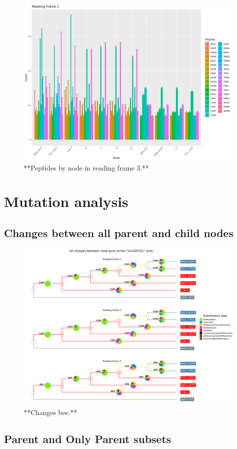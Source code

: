 \documentclass[
]{book}
\begin{document}
\begin{figure}
\includegraphics[width=1\linewidth]{figures/Peptides_RF3} \caption{**Peptides by node in reading frame 3.**}\label{fig:FIG9x}
\end{figure}

\hypertarget{mutation-analysis-1}{%
\section{Mutation analysis}\label{mutation-analysis-1}}

\hypertarget{changes-between-all-parent-and-child-nodes}{%
\subsection{Changes between all parent and child nodes}\label{changes-between-all-parent-and-child-nodes}}

\begin{figure}
\includegraphics[width=1\linewidth]{figures/ALL_SITES_All_codon_mutations_tree} \caption{**Changes bee.**}\label{fig:FIG10x}
\end{figure}

\hypertarget{parent-and-only-parent-subsets-1}{%
\subsection{Parent and Only Parent subsets}\label{parent-and-only-parent-subsets-1}}

  
\end{document}
